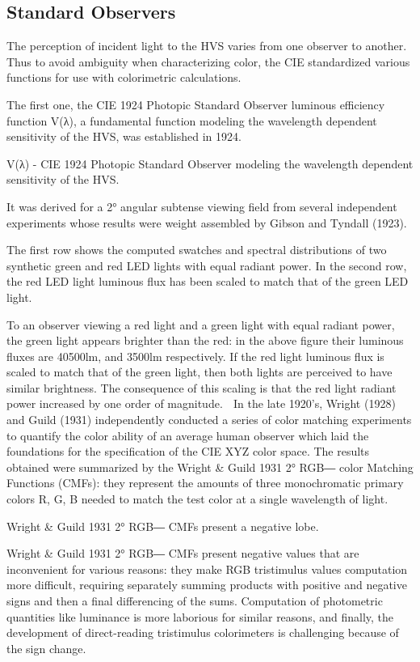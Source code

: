 \subsection{Standard Observers}%
\label{subsec:standard-observers}

The perception of incident light to the HVS varies from one observer to another. Thus to avoid ambiguity when characterizing color, the CIE standardized various functions for use with colorimetric calculations.

The first one, the CIE 1924 Photopic Standard Observer luminous efficiency function V(λ), a fundamental function modeling the wavelength dependent sensitivity of the HVS, was established in 1924.

V(λ) - CIE 1924 Photopic Standard Observer modeling the wavelength dependent sensitivity of the HVS.

It was derived for a 2° angular subtense viewing field from several independent experiments whose results were weight assembled by Gibson and Tyndall (1923).

The first row shows the computed swatches and spectral distributions of two synthetic green and red LED lights with equal radiant power. In the second row, the red LED light luminous flux has been scaled to match that of the green LED light.

To an observer viewing a red light and a green light with equal radiant power, the green light appears brighter than the red: in the above figure their luminous fluxes are 40500lm, and 3500lm respectively. If the red light luminous flux is scaled to match that of the green light, then both lights are perceived to have similar brightness. The consequence of this scaling is that the red light radiant power increased by one order of magnitude.

In the late 1920's, Wright (1928) and Guild (1931) independently conducted a series of color matching experiments to quantify the color ability of an average human observer which laid the foundations for the specification of the CIE XYZ color space. The results obtained were summarized by the Wright & Guild 1931 2° RGB― color Matching Functions (CMFs): they represent the amounts of three monochromatic primary colors R, G, B needed to match the test color at a single wavelength of light.


Wright & Guild 1931 2° RGB― CMFs present a negative lobe.

Wright & Guild 1931 2° RGB― CMFs present negative values that are inconvenient for various reasons: they make RGB tristimulus values computation more difficult, requiring separately summing products with positive and negative signs and then a final differencing of the sums. Computation of photometric quantities like luminance is more laborious for similar reasons, and finally, the development of direct-reading tristimulus colorimeters is challenging because of the sign change.

